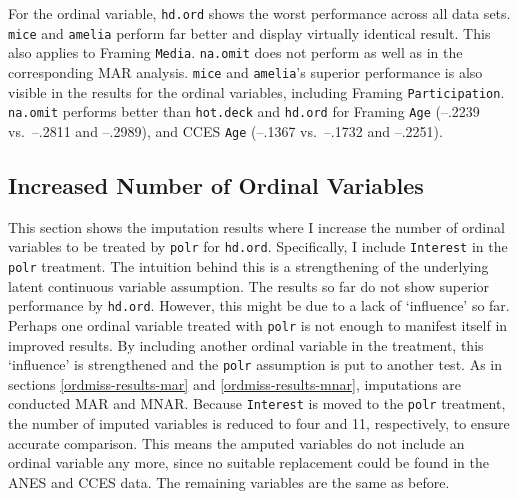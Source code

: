 \documentclass[12pt,econ]{sources/authesis}
\begin{document}
\normalsize

For the ordinal variable, \texttt{hd.ord} shows the worst performance across all data sets. \texttt{mice} and \texttt{amelia} perform far better and display virtually identical result. This also applies to Framing \texttt{Media}. \texttt{na.omit} does not perform as well as in the corresponding MAR analysis. \texttt{mice} and \texttt{amelia}'s superior performance is also visible in the results for the ordinal variables, including Framing \texttt{Participation}. \texttt{na.omit} performs better than \texttt{hot.deck} and \texttt{hd.ord} for Framing \texttt{Age} (--.2239 vs.~--.2811 and --.2989), and CCES \texttt{Age} (--.1367 vs.~--.1732 and --.2251).

\hypertarget{ordmiss-results-increaseOrd}{%
\subsection{Increased Number of Ordinal Variables}\label{ordmiss-results-increaseOrd}}

This section shows the imputation results where I increase the number of ordinal variables to be treated by \texttt{polr} for \texttt{hd.ord}. Specifically, I include \texttt{Interest} in the \texttt{polr} treatment. The intuition behind this is a strengthening of the underlying latent continuous variable assumption. The results so far do not show superior performance by \texttt{hd.ord}. However, this might be due to a lack of `influence' so far. Perhaps one ordinal variable treated with \texttt{polr} is not enough to manifest itself in improved results. By including another ordinal variable in the treatment, this `influence' is strengthened and the \texttt{polr} assumption is put to another test. As in sections \ref{ordmiss-results-mar} and \ref{ordmiss-results-mnar}, imputations are conducted MAR and MNAR. Because \texttt{Interest} is moved to the \texttt{polr} treatment, the number of imputed variables is reduced to four and 11, respectively, to ensure accurate comparison. This means the amputed variables do not include an ordinal variable any more, since no suitable replacement could be found in the ANES and CCES data. The remaining variables are the same as before.
\end{document}
